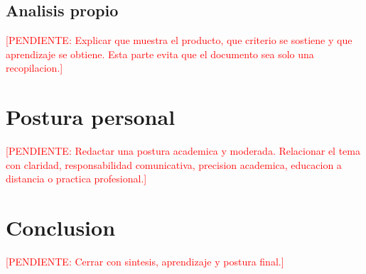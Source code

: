 \documentclass[
	spanish,
	letterpaper, oneside
]{article}
\newcommand{\pendiente}[1]{\textcolor{red}{[PENDIENTE: #1]}}
\begin{document}
\subsection{Analisis propio}

\pendiente{Explicar que muestra el producto, que criterio se sostiene y que aprendizaje se obtiene. Esta parte evita que el documento sea solo una recopilacion.}

\section{Postura personal}

\pendiente{Redactar una postura academica y moderada. Relacionar el tema con claridad, responsabilidad comunicativa, precision academica, educacion a distancia o practica profesional.}

\section{Conclusion}

\pendiente{Cerrar con sintesis, aprendizaje y postura final.}





\end{document}
